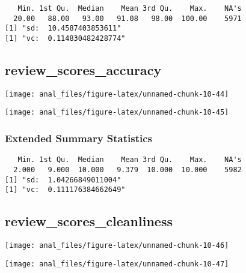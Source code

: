 \begin{verbatim}   Min. 1st Qu.  Median    Mean 3rd Qu.    Max.    NA's 
  20.00   88.00   93.00   91.08   98.00  100.00    5971 
[1] "sd:  10.4587403853611"
[1] "vc:  0.114830482428774"
\end{verbatim}

\pagebreak

\hypertarget{review_scores_accuracy}{%
\subsection{review\_scores\_accuracy}\label{review_scores_accuracy}}

\begin{center}\texttt{[image: anal\_files/figure-latex/unnamed-chunk-10-44]} \end{center}

\begin{center}\texttt{[image: anal\_files/figure-latex/unnamed-chunk-10-45]} \end{center}

\hypertarget{extended-summary-statistics-15}{%
\subsubsection{Extended Summary
Statistics}\label{extended-summary-statistics-15}}

\begin{verbatim}   Min. 1st Qu.  Median    Mean 3rd Qu.    Max.    NA's 
  2.000   9.000  10.000   9.379  10.000  10.000    5982 
[1] "sd:  1.04266849011004"
[1] "vc:  0.111176384662649"
\end{verbatim}

\pagebreak

\hypertarget{review_scores_cleanliness}{%
\subsection{review\_scores\_cleanliness}\label{review_scores_cleanliness}}

\begin{center}\texttt{[image: anal\_files/figure-latex/unnamed-chunk-10-46]} \end{center}

\begin{center}\texttt{[image: anal\_files/figure-latex/unnamed-chunk-10-47]} \end{center}

